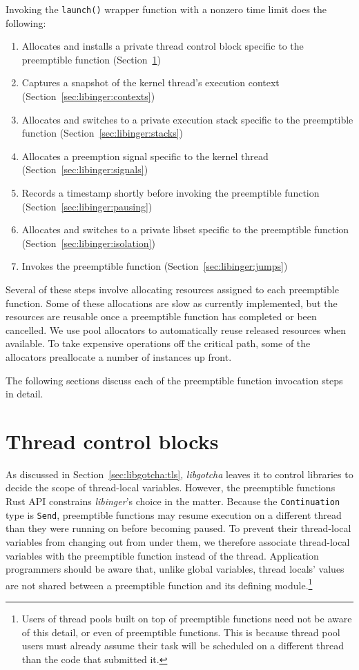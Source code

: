 Invoking the \texttt{launch()} wrapper function with a nonzero time limit does the
following:
\begin{enumerate}
\item Allocates and installs a private thread control block specific to the preemptible function (Section~\ref{sec:libinger:tcbs})
\item Captures a snapshot of the kernel thread's execution context (Section~\ref{sec:libinger:contexts})
\item Allocates and switches to a private execution stack specific to the preemptible function (Section~\ref{sec:libinger:stacks})
\item Allocates a preemption signal specific to the kernel thread (Section~\ref{sec:libinger:signals})
\item Records a timestamp shortly before invoking the preemptible function (Section~\ref{sec:libinger:pausing})
\item Allocates and switches to a private libset specific to the preemptible function (Section~\ref{sec:libinger:isolation})
\item Invokes the preemptible function (Section~\ref{sec:libinger:jumps})
\end{enumerate}

Several of these steps involve allocating resources assigned to each preemptible
function.  Some of these allocations are slow as currently implemented, but the
resources are reusable once a preemptible function has completed or been cancelled.
We use pool allocators to automatically reuse released resources when available.  To
take expensive operations off the critical path, some of the allocators preallocate a
number of instances up front.

The following sections discuss each of the preemptible function invocation steps in
detail.


\section{Thread control blocks}
\label{sec:libinger:tcbs}

As discussed in Section~\ref{sec:libgotcha:tls}, \textit{libgotcha} leaves it to
control libraries to decide the scope of thread-local variables.  However, the
preemptible functions Rust API constrains \textit{libinger}'s choice in the matter.
Because the \texttt{Continuation} type is \texttt{Send}, preemptible functions may
resume execution on a different thread than they were running on before becoming
paused.  To prevent their thread-local variables from changing out from under them,
we therefore associate thread-local variables with the preemptible function instead
of the thread.  Application programmers should be aware that, unlike global
variables, thread locals' values are not shared between a preemptible function and
its defining module.\footnote{Users of thread pools built on top of preemptible
functions need not be aware of this detail, or even of preemptible functions.  This
is because thread pool users must already assume their task will be scheduled on a
different thread than the code that submitted it.}


